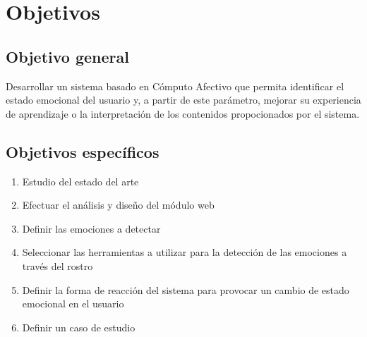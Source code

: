 \section{Objetivos}

\subsection{Objetivo general}
\noindent
Desarrollar un sistema basado en Cómputo Afectivo que permita identificar el estado emocional del usuario y, a partir de este parámetro, mejorar su experiencia de aprendizaje o la interpretación de los contenidos propocionados por el sistema.

\subsection{Objetivos específicos}

\begin{enumerate}
\item Estudio del estado del arte
\item Efectuar el análisis y diseño del módulo web
\item Definir las emociones a detectar
\item Seleccionar las herramientas a utilizar para la detección de las emociones a través del rostro
\item Definir la forma de reacción del sistema para provocar un cambio de estado emocional en el usuario
\item Definir un caso de estudio
\end{enumerate}


